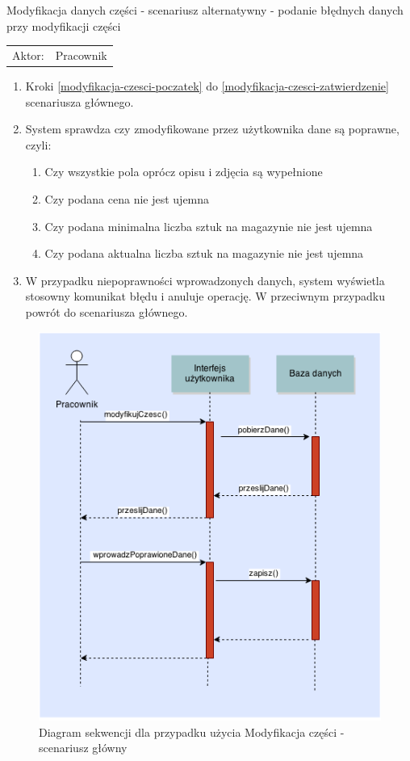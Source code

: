   \item Modyfikacja danych części - scenariusz alternatywny - podanie błędnych danych przy modyfikacji części \\
  \begin{tabularx}{\linewidth}{ c X}
  Aktor: & Pracownik \\
  \end{tabularx}
   \begin{enumerate}
    \item Kroki \ref{modyfikacja-czesci-poczatek} do \ref{modyfikacja-czesci-zatwierdzenie} scenariusza głównego.
    \item System sprawdza czy zmodyfikowane przez użytkownika dane są poprawne, czyli:
    \begin{enumerate}
      \item Czy wszystkie pola oprócz opisu i zdjęcia są wypełnione
      \item Czy podana cena nie jest ujemna
      \item Czy podana minimalna liczba sztuk na magazynie nie jest ujemna
      \item Czy podana aktualna liczba sztuk na magazynie nie jest ujemna
    \end{enumerate}
    \item W przypadku niepoprawności wprowadzonych danych, system wyświetla stosowny komunikat błędu i anuluje operację. W przeciwnym przypadku powrót do scenariusza głównego.
  \end{enumerate}
  	
\begin{figure}[h!]
    \includegraphics[width=\textwidth,
    height=0.7\textheight]{graphics/UseCase/Czesci/ModyfikacjaCzesciSD.png}
  \caption{Diagram sekwencji dla przypadku użycia Modyfikacja części - scenariusz główny}
\end{figure}